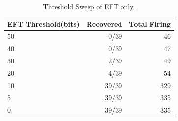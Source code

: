 \begin{table}
  \caption{Threshold Sweep of EFT only.}
  \label{tab:theshold_sweep}
  \centering
  \begin{tabular}{lrr}
    \toprule
    EFT Threshold(bits) & Recovered & Total Firing\\
    \midrule
    50 & 0/39 & 46\\
    40 & 0/39 & 47\\
    30 & 2/39 & 49\\
    20 & 4/39 & 54\\
    10 & 39/39 & 329\\
    5 & 39/39 & 335\\
    0 & 39/39 & 335\\
  \bottomrule
\end{tabular}
\end{table}